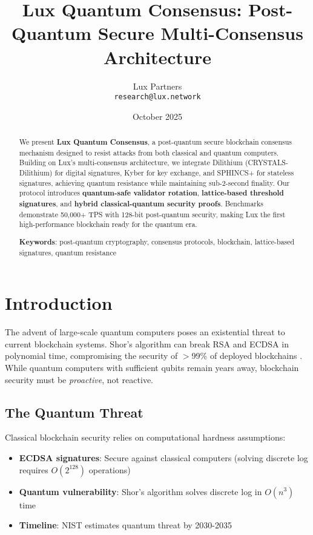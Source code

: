\documentclass[11pt,letterpaper]{article}
\title{Lux Quantum Consensus: Post-Quantum Secure Multi-Consensus Architecture}
\author{
  Lux Partners \\
  \texttt{research@lux.network}
}
\date{October 2025}
\begin{document}
\maketitle

\begin{abstract}
We present \textbf{Lux Quantum Consensus}, a post-quantum secure blockchain consensus mechanism designed to resist attacks from both classical and quantum computers. Building on Lux's multi-consensus architecture, we integrate Dilithium (CRYSTALS-Dilithium) for digital signatures, Kyber for key exchange, and SPHINCS+ for stateless signatures, achieving quantum resistance while maintaining sub-2-second finality. Our protocol introduces \textbf{quantum-safe validator rotation}, \textbf{lattice-based threshold signatures}, and \textbf{hybrid classical-quantum security proofs}. Benchmarks demonstrate 50,000+ TPS with 128-bit post-quantum security, making Lux the first high-performance blockchain ready for the quantum era.

\textbf{Keywords}: post-quantum cryptography, consensus protocols, blockchain, lattice-based signatures, quantum resistance
\end{abstract}

\section{Introduction}

The advent of large-scale quantum computers poses an existential threat to current blockchain systems. Shor's algorithm can break RSA and ECDSA in polynomial time, compromising the security of $>$99\% of deployed blockchains \cite{shor1997}. While quantum computers with sufficient qubits remain years away, blockchain security must be \emph{proactive}, not reactive.

\subsection{The Quantum Threat}

Classical blockchain security relies on computational hardness assumptions:
\begin{itemize}
    \item \textbf{ECDSA signatures}: Secure against classical computers (solving discrete log requires $O(2^{128})$ operations)
    \item \textbf{Quantum vulnerability}: Shor's algorithm solves discrete log in $O(n^3)$ time
    \item \textbf{Timeline}: NIST estimates quantum threat by 2030-2035 \cite{nist2022}
\end{itemize}
\end{document}

